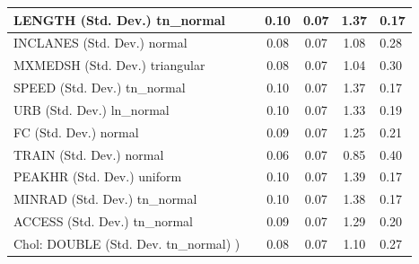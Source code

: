 \begin{table}
\begin{center}
\begin{tabular}{|l|l|c|c|c|l|}
			\hline
			LENGTH (Std. Dev.) tn_normal &  & 0.10 & 0.07 & 1.37 & 0.17 \\
			\hline
			INCLANES (Std. Dev.) normal &  & 0.08 & 0.07 & 1.08 & 0.28 \\
			\hline
			MXMEDSH (Std. Dev.) triangular &  & 0.08 & 0.07 & 1.04 & 0.30 \\
			\hline
			SPEED (Std. Dev.) tn_normal &  & 0.10 & 0.07 & 1.37 & 0.17 \\
			\hline
			URB (Std. Dev.) ln_normal &  & 0.10 & 0.07 & 1.33 & 0.19 \\
			\hline
			FC (Std. Dev.) normal &  & 0.09 & 0.07 & 1.25 & 0.21 \\
			\hline
			TRAIN (Std. Dev.) normal &  & 0.06 & 0.07 & 0.85 & 0.40 \\
			\hline
			PEAKHR (Std. Dev.) uniform &  & 0.10 & 0.07 & 1.39 & 0.17 \\
			\hline
			MINRAD (Std. Dev.) tn_normal &  & 0.10 & 0.07 & 1.38 & 0.17 \\
			\hline
			ACCESS (Std. Dev.) tn_normal &  & 0.09 & 0.07 & 1.29 & 0.20 \\
			\hline
			 Chol: DOUBLE (Std. Dev. tn_normal) ) &  & 0.08 & 0.07 & 1.10 & 0.27 \\
			\hline
		\end{tabular}
	\end{center}
\end{table}